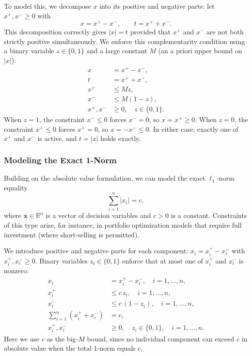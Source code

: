 To model this, we decompose $x$ into its positive and negative parts: let $x^+, x^- \geq 0$ with
\[
x = x^+ - x^-, \qquad t = x^+ + x^-.
\]
This decomposition correctly gives $|x| = t$ provided that $x^+$ and $x^-$ are not both strictly positive simultaneously.  We enforce this complementarity condition using a binary variable $z \in \{0,1\}$ and a large constant $M$ (an a priori upper bound on $|x|$):
\[
\begin{aligned}
x &= x^+ - x^-, \\
t &= x^+ + x^-, \\
x^+ &\leq Mz, \\
x^- &\leq M(1 - z), \\
x^+, x^- &\geq 0, \quad z \in \{0,1\}.
\end{aligned}
\]
When $z = 1$, the constraint $x^- \leq 0$ forces $x^- = 0$, so $x = x^+ \geq 0$.  When $z = 0$, the constraint $x^+ \leq 0$ forces $x^+ = 0$, so $x = -x^- \leq 0$.  In either case, exactly one of $x^+$ and $x^-$ is active, and $t = |x|$ holds exactly.

\subsubsection{Modeling the Exact 1-Norm}

Building on the absolute value formulation, we can model the exact $\ell_1$-norm equality
\[
\sum_{i=1}^n |x_i| = c,
\]
where $\mathbf{x} \in \mathbb{R}^n$ is a vector of decision variables and $c > 0$ is a constant.  Constraints of this type arise, for instance, in portfolio optimization models that require full investment (where short-selling is permitted).

We introduce positive and negative parts for each component: $x_i = x_i^+ - x_i^-$ with $x_i^+, x_i^- \geq 0$.  Binary variables $z_i \in \{0,1\}$ enforce that at most one of $x_i^+$ and $x_i^-$ is nonzero:
\[
\begin{aligned}
x_i &= x_i^+ - x_i^-, \quad i = 1, \ldots, n, \\
x_i^+ &\leq c \, z_i, \quad i = 1, \ldots, n, \\
x_i^- &\leq c \, (1 - z_i), \quad i = 1, \ldots, n, \\
\sum_{i=1}^n (x_i^+ + x_i^-) &= c, \\
x_i^+, x_i^- &\geq 0, \quad z_i \in \{0,1\}, \quad i = 1, \ldots, n.
\end{aligned}
\]
Here we use $c$ as the big-$M$ bound, since no individual component can exceed $c$ in absolute value when the total 1-norm equals $c$.

